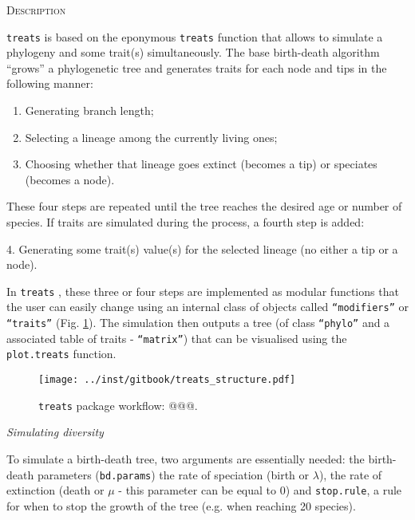 \documentclass[12pt,letterpaper]{article}
\renewcommand{\section}[1]{%
\bigskip
\begin{center}
\begin{Large}
\normalfont\scshape #1
\medskip
\end{Large}
\end{center}}
\renewcommand{\subsection}[1]{%
\bigskip
\begin{center}
\begin{large}
\normalfont\itshape #1
\end{large}
\end{center}}
\newcommand{\treats}{\texttt{treats} }
\begin{document}
\section{Description}
\treats is based on the eponymous \treats function that allows to simulate a phylogeny and some trait(s) simultaneously.
The base birth-death algorithm ``grows'' a phylogenetic tree and generates traits for each node and tips in the following manner:

\begin{enumerate}
    \item Generating branch length;
    \item Selecting a lineage among the currently living ones;
    \item Choosing whether that lineage goes extinct (becomes a tip) or speciates (becomes a node).
\end{enumerate}

These four steps are repeated until the tree reaches the desired age or number of species.
If traits are simulated during the process, a fourth step is added:

    4. Generating some trait(s) value(s) for the selected lineage (no either a tip or a node).

In \treats, these three or four steps are implemented as modular functions that the user can easily change using an internal class of objects called \texttt{``modifiers''} or \texttt{``traits''} (Fig. \ref{Fig:workflow}).
The simulation then outputs a tree (of class \texttt{``phylo''} and a associated table of traits - \texttt{``matrix''}) that can be visualised using the \texttt{plot.treats} function.

\begin{figure}[!htbp]
\centering
   \texttt{[image: ../inst/gitbook/treats\_structure.pdf]} 
\caption{\treats package workflow: @@@.}
\label{Fig:workflow}
\end{figure}

\subsection{Simulating diversity}

To simulate a birth-death tree, two arguments are essentially needed: the birth-death parameters (\texttt{bd.params}) the rate of speciation (birth or $\lambda$), the rate of extinction (death or $\mu$ - this parameter can be equal to 0) and \texttt{stop.rule}, a rule for when to stop the growth of the tree (e.g. when reaching 20 species).
\end{document}
